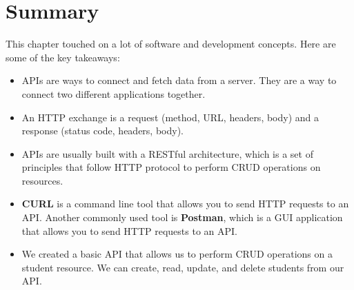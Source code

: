 \section{Summary}

This chapter touched on a lot of software and development concepts. Here are some of the key takeaways:
\begin{itemize}
  \item APIs are ways to connect and fetch data from a server. They are a way to connect two different applications together.
  \item An HTTP exchange is a request (method, URL, headers, body) and a response (status code, headers, body).
  \item APIs are usually built with a RESTful architecture, which is a set of principles that follow HTTP protocol to perform CRUD operations on resources.
  \item \textbf{CURL} is a command line tool that allows you to send HTTP requests to an API. Another commonly used tool is \textbf{Postman}, which is a GUI application that allows you to send HTTP requests to an API.
  \item We created a basic API that allows us to perform CRUD operations on a student resource. We can create, read, update, and delete students from our API.
\end{itemize}
